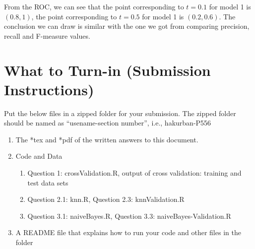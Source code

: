 \documentclass{article}
\newcommand{\quotes}[1]{``#1''}
\begin{document}
From the ROC, we can see that the point corresponding to $t=0.1$ for model 1 is 
$(0.8, 1)$,
the point corresponding to $t=0.5$ for model 1 is
$(0.2, 0.6)$. The conclusion we can draw is similar with the one we got from comparing precision, recall and F-measure values.


































\pagebreak
\section*{What to Turn-in (Submission Instructions)}

Put the below files in a zipped folder for your submission. The zipped folder should be named as \quotes{usename-section number}, i.e., hakurban-P556
\begin{enumerate}
\item The *tex and *pdf of the written answers to this document.
\item Code and Data
\begin{enumerate}
\item  Question 1: \textsf{crossValidation.R}, output of cross validation: training  and test data sets 
\item  Question 2.1: \textsf{knn.R}, Question 2.3: \textsf{knnValidation.R}
\item  Question 3.1: \textsf{naiveBayes.R}, Question 3.3: \textsf{naiveBayes-Validation.R}
\end{enumerate}
\item A README file that explains how to run your code and other files in the folder
\end{enumerate}
























 
\end{document}
